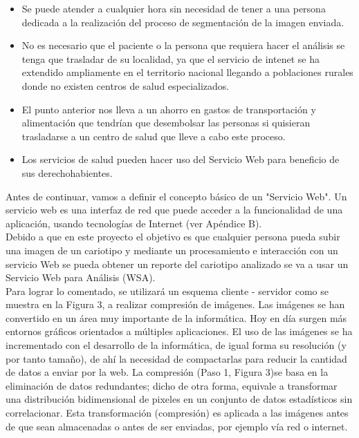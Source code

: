 \documentclass[12pt,letterpaper,titlepage]{article}
\begin{document}
\begin{itemize}
\begin{itemize}\itemsep=0pt
\item  Se puede atender a cualquier hora sin necesidad de tener a una persona dedicada a la realización del proceso de segmentación de la imagen enviada.\\
\item No es necesario que el paciente o la persona que requiera hacer el análisis se tenga que trasladar de su localidad, ya que el servicio de intenet se ha extendido 
ampliamente en el territorio nacional llegando a poblaciones rurales donde no existen centros de salud especializados.\\
\item El punto anterior nos lleva a un ahorro en gastos de transportación y alimentación que tendrían que desembolsar las personas si quisieran trasladarse a un centro de salud que lleve a cabo este proceso.\\
\item Los servicios de salud pueden hacer uso del Servicio Web para beneficio de sus derechohabientes.\\
\end{itemize}

Antes de continuar, vamos a definir el concepto básico de un "Servicio Web". Un servicio web es una interfaz de red que puede acceder a la funcionalidad de una aplicación, usando tecnologías de Internet (ver Apéndice B). \\ %



Debido a que en este proyecto el objetivo es que cualquier persona pueda subir una imagen de un cariotipo y mediante un procesamiento e interacción con un servicio Web se pueda obtener un reporte del cariotipo analizado se va a usar un Servicio Web para Análisis (WSA).\\

Para lograr lo comentado, se utilizará un esquema cliente - servidor como se muestra en la Figura 3, a realizar compresión de imágenes. Las imágenes se han convertido en un área muy importante de la informática. Hoy en día surgen más entornos gráficos orientados a múltiples aplicaciones. El uso de las imágenes se ha incrementado con el desarrollo de la informática, de igual forma su resolución (y por tanto tamaño), de ahí la necesidad de compactarlas para reducir la cantidad de datos a enviar por la web. La compresión (Paso 1, Figura 3)se basa en la eliminación de datos redundantes; dicho de otra forma, equivale a transformar una distribución bidimensional de pixeles en un conjunto de datos estadísticos sin correlacionar. Esta transformación (compresión) es aplicada a las imágenes antes de que sean almacenadas o antes de ser enviadas, por ejemplo vía red o internet. \\


\end{itemize}
\end{document}
